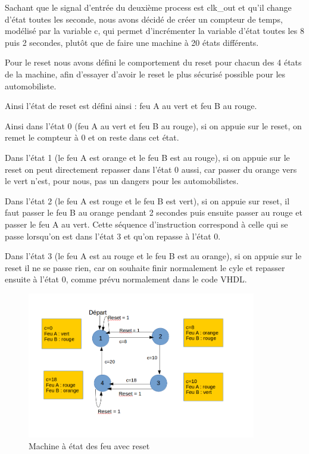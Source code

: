 \documentclass[11pt]{report}
\begin{document}
Sachant que le signal d'entrée du deuxième process est clk\_out et qu'il change d'état toutes les seconde, nous avons décidé de créer un compteur de temps, modélisé par la variable c, qui permet d'incrémenter la variable d'état toutes les 8 puis 2 secondes, plutôt que de faire une machine à 20 états différents.

Pour le reset nous avons défini le comportement du reset pour chacun des 4 états de la machine, afin d'essayer d'avoir le reset le plus sécurisé possible pour les automobiliste.

Ainsi l'état de reset est défini ainsi : feu A au vert et feu B au rouge.

Ainsi dans l'état 0 (feu A au vert et feu B au rouge), si on appuie sur le reset, on remet le compteur à 0 et on reste dans cet état.

Dans l'état 1 (le feu A est orange et le feu B est au rouge), si on appuie sur le reset on peut directement repasser dans l'état 0 aussi, car passer du orange vers le vert n'est, pour nous, pas un dangers pour les automobilistes.

Dans l'état 2 (le feu A est rouge et le feu B est vert), si on appuie sur reset, il faut passer le feu B au orange pendant 2 secondes puis ensuite passer au rouge et passer le feu A au vert. Cette séquence d'instruction correspond à celle qui se passe lorsqu'on est dans l'état 3 et qu'on repasse à l'état 0.

Dans l'état 3 (le feu A est au rouge et le feu B est au orange), si on appuie sur le reset il ne se passe rien, car on souhaite finir normalement le cyle et repasser ensuite à l'état 0, comme prévu normalement dans le code VHDL.

\begin{figure}[h]
\includegraphics[width=10cm]{TP03-2 .png}
\caption{Machine à état des feu avec reset}
\end{figure}
\end{document}
